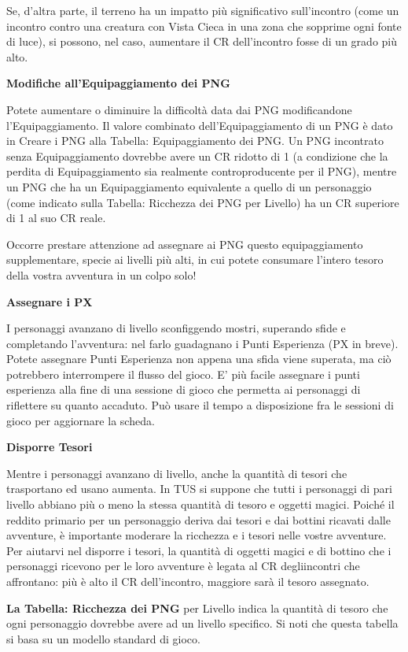\documentclass[a4paper,11pt,twoside,openany]{book}
\begin{document}
Se, d’altra parte, il terreno ha un impatto più significativo sull'incontro (come un incontro contro una creatura con Vista Cieca in una zona che sopprime ogni fonte di luce), si possono, nel caso, aumentare il CR dell'incontro fosse di un grado più alto.


\textbf{Modifiche all'Equipaggiamento dei PNG}

Potete aumentare o diminuire la difficoltà data dai PNG modificandone l'Equipaggiamento. Il valore combinato dell'Equipaggiamento di un PNG è dato in Creare i PNG alla Tabella: Equipaggiamento dei PNG. Un PNG incontrato senza Equipaggiamento dovrebbe avere un CR ridotto di 1 (a condizione che la perdita di Equipaggiamento sia realmente controproducente per il PNG), mentre un PNG che ha un Equipaggiamento equivalente a quello di un personaggio (come indicato sulla Tabella: Ricchezza dei PNG per Livello) ha un CR superiore di 1 al suo CR reale.

Occorre prestare attenzione ad assegnare ai PNG questo equipaggiamento supplementare, specie ai livelli più alti, in cui potete consumare l'intero tesoro della vostra avventura in un colpo solo!

\textbf{Assegnare i PX}

I personaggi avanzano di livello sconfiggendo mostri, superando sfide e completando l'avventura: nel farlo guadagnano i Punti Esperienza (PX in breve). Potete assegnare Punti Esperienza non appena una sfida viene superata, ma ciò potrebbero interrompere il flusso del gioco. E' più facile assegnare i punti esperienza alla fine di una sessione di gioco che permetta ai personaggi di riflettere su quanto accaduto. Può usare il tempo a disposizione fra le sessioni di gioco per aggiornare la scheda.

\textbf{Disporre Tesori}

Mentre i personaggi avanzano di livello, anche la quantità di tesori che trasportano ed usano aumenta. In TUS si suppone che tutti i personaggi di pari livello abbiano più o meno la stessa quantità di tesoro e oggetti magici. Poiché il reddito primario per un personaggio deriva dai tesori e dai bottini ricavati dalle avventure, è importante moderare la ricchezza e i tesori nelle vostre avventure. Per aiutarvi nel disporre i tesori, la quantità di oggetti magici e di bottino che i personaggi ricevono per le loro avventure è legata al CR degliincontri che affrontano: più è alto il CR dell'incontro, maggiore sarà il tesoro assegnato.

\textbf{La Tabella: Ricchezza dei PNG} per Livello indica la quantità di tesoro che ogni personaggio dovrebbe avere ad un livello specifico. Si noti che questa tabella si basa su un modello standard di gioco.
\end{document}
